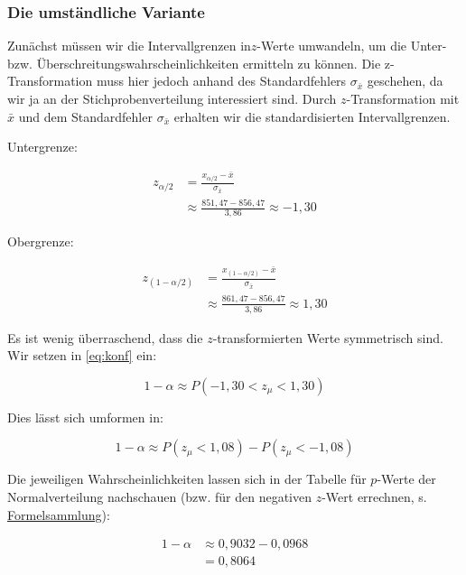 \documentclass[
  11pt,
  ngerman,
  a4paper,
]{report}
\begin{document}
\hypertarget{die-umstuxe4ndliche-variante}{%
\subsubsection{Die umständliche Variante}\label{die-umstuxe4ndliche-variante}}

Zunächst müssen wir die Intervallgrenzen in\(z\)-Werte umwandeln, um die Unter- bzw. Überschreitungswahrscheinlichkeiten ermitteln zu können. Die z-Transformation muss hier jedoch anhand des Standardfehlers \(\sigma_{\bar{x}}\) geschehen, da wir ja an der Stichprobenverteilung interessiert sind. Durch \(z\)-Transformation mit \(\bar{x}\) und dem Standardfehler \(\sigma_{\bar{x}}\) erhalten wir die standardisierten Intervallgrenzen.

Untergrenze:

\nopagebreak

\[\begin{aligned}
z_{\alpha/2} &= \frac{x_{\alpha/2}-\bar{x}}{\sigma_{\bar{x}}}\\[4pt]
&\approx\frac{851{,}47-856,47}{3,86}\approx-1,30
\end{aligned}\]

Obergrenze:

\nopagebreak

\[\begin{aligned}
z_{(1-\alpha/2)} &= \frac{x_{(1-\alpha/2)}-\bar{x}}{\sigma_{\bar{x}}}\\[4pt]
&\approx\frac{861{,}47-856,47}{3,86}\approx1,30
\end{aligned}\]

Es ist wenig überraschend, dass die \(z\)-transformierten Werte symmetrisch sind. Wir setzen in \eqref{eq:konf} ein:

\nopagebreak

\[1-\alpha\approx P(-1{,}30 <z_{\mu} < 1{,}30)\]

Dies lässt sich umformen in:

\nopagebreak

\[
1-\alpha\approx P(z_{\mu}<1{,}08) - P(z_{\mu}<-1{,}08) 
\]

Die jeweiligen Wahrscheinlichkeiten lassen sich in der Tabelle für \(p\)-Werte der Normalverteilung nachschauen (bzw. für den negativen \(z\)-Wert errechnen, s. \href{Formelsammlung\%20und\%20Wertetabellen.pdf}{Formelsammlung}):

\nopagebreak

\[
\begin{aligned}
1-\alpha&\approx 0,9032 - 0,0968\\
&=0,8064
\end{aligned}
\]
\end{document}
